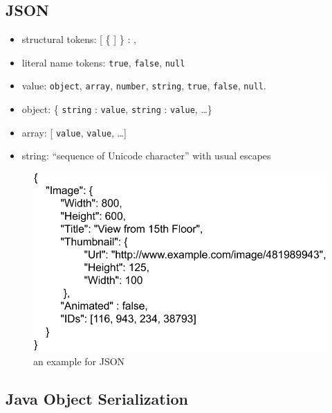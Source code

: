 \documentclass[twocolumn,landscape,10pt]{article}
\theoremstyle{definition}
\begin{document}
\subsection{JSON}

\begin{itemize}
    \item structural tokens: [ \{ ] \} : ,
    \item literal name tokens: \texttt{true}, \texttt{false}, \texttt{null}
    \item value: \texttt{object}, \texttt{array}, \texttt{number},
        \texttt{string}, \texttt{true}, \texttt{false}, \texttt{null}.
    \item object: \{ \texttt{string} : \texttt{value}, \texttt{string} : \texttt{value}, \ldots\}
    \item array: [ \texttt{value}, \texttt{value}, \ldots]
    \item string: ``\textlangle sequence of Unicode character\textrangle'' with usual escapes
\end{itemize} 

\begin{figure}
  	\includegraphics[scale=0.3]{JSON.png}
  	\centering
    \caption{an example for JSON}
\end{figure}


\subsection{Java Object Serialization}
\end{document}
